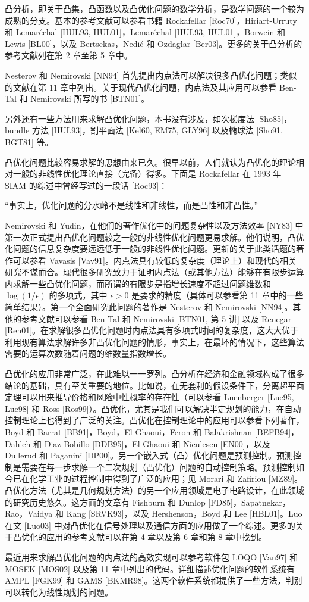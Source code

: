 \documentclass[UTF8, 12pt, fontset=fandol, oneside]{ctexart}
\begin{document}
凸分析，即关于凸集，凸函数以及凸优化问题的数学分析，是数学问题的一个较为成熟的分支。基本的参考文献可以参看书籍 Rockafellar [Roc70]，Hiriart-Urruty 和 Lemaréchal [HUL93, HUL01]，Lemaréchal [HUL93, HUL01]，Borwein 和 Lewis [BL00]，以及 Bertsekas，Nedić 和 Ozdaglar [Ber03]。更多的关于凸分析的参考文献列在第 2 章至第 5 章中。

Nesterov 和 Nemirovski [NN94] 首先提出内点法可以解决很多凸优化问题；类似的文献在第 11 章中列出。关于现代凸优化问题，内点法及其应用可以参看 Ben-Tal 和 Nemirovski 所写的书 [BTN01]。

另外还有一些方法用来求解凸优化问题，本书没有涉及，如次梯度法 [Sho85]，bundle 方法 [HUL93]，割平面法 [Kel60, EM75, GLY96] 以及椭球法 [Sho91, BGT81] 等。

凸优化问题比较容易求解的思想由来已久。很早以前，人们就认为凸优化的理论相对一般的非线性优化理论直接（完备）得多。下面是 Rockafellar 在 1993 年 SIAM 的综述中曾经写过的一段话 [Roc93]：

“事实上，优化问题的分水岭不是线性和非线性，而是凸性和非凸性。”

Nemirovski 和 Yudin，在他们的著作优化中的问题复杂性以及方法效率 [NY83] 中第一次正式提出凸优化问题较之一般的非线性优化问题更易求解。他们说明，凸优化问题的信息复杂度要远远低于一般的非线性优化问题。更新的关于此类话题的著作可以参看 Vavasis [Vav91]。内点法具有较低的复杂度（理论上）和现代的相关研究不谋而合。现代很多研究致力于证明内点法（或其他方法）能够在有限步运算内求解一些凸优化问题，而所谓的有限步是指增长速度不超过问题维数和 $\log(1/\epsilon)$ 的多项式，其中 $\epsilon>0$ 是要求的精度（具体可以参看第 11 章中的一些简单结果）。第一个全面研究此问题的著作是 Nesterov 和 Nemirovski [NN94]。其他的参考文献可以参看 Ben-Tal 和 Nemirovski [BTN01, 第 5 讲] 以及 Renegar [Ren01]。在求解很多凸优化问题时内点法具有多项式时间的复杂度，这大大优于利用现有算法求解许多非凸优化问题的情形，事实上，在最坏的情况下，这些算法需要的运算次数随着问题的维数量指数增长。

凸优化的应用非常广泛，在此难以一一罗列。凸分析在经济和金融领域构成了很多结论的基础，具有至关重要的地位。比如说，在无套利的假设条件下，分离超平面定理可以用来推导价格和风险中性概率的存在性（可以参看 Luenberger [Lue95, Lue98] 和 Ross [Ros99]）。凸优化，尤其是我们可以解决半定规划的能力，在自动控制理论上也得到了广泛的关注。凸优化在控制理论中的应用可以参看下列著作，Boyd 和 Barrat [BB91]，Boyd，El Ghaoui，Feron 和 Balakrishnan [BEFB94]，Dahleh 和 Diaz-Bobillo [DDB95]，El Ghaoui 和 Niculescu [EN00]，以及 Dullerud 和 Paganini [DP00]。另一个嵌入式（凸）优化问题是预测控制。预测控制是需要在每一步求解一个二次规划（凸优化）问题的自动控制策略。预测控制如今已在化学工业的过程控制中得到了广泛的应用；见 Morari 和 Zafiriou [MZ89]。凸优化方法（尤其是几何规划方法）的另一个应用领域是电子电路设计，在此领域的研究历史悠久。这方面的文章有 Fishburn 和 Dunlop [FD85]，Sapatnekar，Rao，Vaidya 和 Kang [SRVK93]，以及 Hershenson，Boyd 和 Lee [HBL01]。Luo 在文 [Luo03] 中对凸优化在信号处理以及通信方面的应用做了一个综述。更多的关于凸优化的应用的参考文献可以在第 4 章以及第 6 章和第 8 章中找到。

最近用来求解凸优化问题的内点法的高效实现可以参考软件包 LOQO [Van97] 和 MOSEK [MOS02] 以及第 11 章中列出的代码。详细描述优化问题的软件系统有 AMPL [FGK99] 和 GAMS [BKMR98]。这两个软件系统都提供了一些方法，判别可以转化为线性规划的问题。
\end{document}
